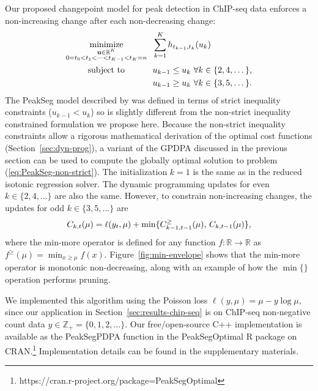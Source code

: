 \documentclass[aoas]{imsart}
\newcommand{\url}[1]{#1}
\DeclareMathOperator*{\minimize}{minimize}
\newcommand{\ZZ}{\mathbb Z}
\newcommand{\RR}{\mathbb R}
\begin{document}
Our proposed changepoint model for peak detection in ChIP-seq data enforces a
non-increasing change after each non-decreasing change:
\begin{align}
  \label{eq:PeakSeg-non-strict}
  \minimize_{
        \substack{\mathbf u\in\RR^K \\
    0=t_0<t_1<\cdots<t_{K-1}<t_K=n
}
    } &\ \ 
  \sum_{k=1}^K h_{t_{k-1}, t_k}(u_k)\\
      \text{subject to \hskip 0.8cm} &\ \ u_{k-1} \leq u_k\ \forall k\in\{2,4,\dots\},
  \nonumber\\
  &\ \ u_{k-1} \geq u_k\ \forall k\in\{3,5,\dots\}.
  \nonumber
\nonumber
\end{align}
The PeakSeg model described by \citet{HOCKING-PeakSeg} was defined in
terms of strict inequality constraints ($u_{k-1}<u_k$) so is slightly
different from the non-strict inequality constrained formulation we
propose here. Because the non-strict inequality constraints allow a
rigorous mathematical derivation of the optimal cost functions
(Section~\ref{sec:dyn-prog}), a variant of the GPDPA discussed in the
previous section can be used to compute the globally optimal solution
to problem (\ref{eq:PeakSeg-non-strict}). The initialization $k=1$ is
the same as in the reduced isotonic regression solver. The dynamic
programming updates for even $k\in\{2, 4, \dots\}$ are also the
same. However, to constrain non-increasing changes, the updates for
odd $k\in\{3, 5, \dots\}$ are
\begin{equation}
  \FCC_{k,t}(\mu) = \ell(y_t, \mu) + \min\{
  \FCC_{k-1,t-1}^\geq(\mu),\, \FCC_{k,t-1}(\mu)
  \},
\end{equation}
where the min-more operator is defined for any function $f:\RR\rightarrow\RR$ as
$f^\geq(\mu) = \min_{x\geq \mu} f(x)$. Figure~\ref{fig:min-envelope}
shows that the min-more operator is monotonic non-decreasing, along
with an example of how the $\min\{\}$ operation performs pruning.

We implemented this algorithm using the Poisson loss
$\ell(y, \mu) = \mu - y\log \mu$, since our application in
Section~\ref{sec:results-chip-seq} is on ChIP-seq non-negative count data
$y\in\ZZ_+ = \{0, 1, 2, \dots\}$.
Our free/open-source C++ implementation is
available as the PeakSegPDPA function in the PeakSegOptimal R package
on
CRAN.\footnote{\url{https://cran.r-project.org/package=PeakSegOptimal}}
Implementation details can be found in the supplementary materials.
\end{document}
